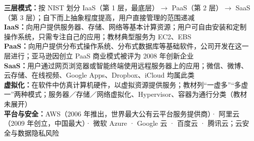 \documentclass[a4paper,11pt]{article}
\begin{document}

\begin{knowmap}
\textbf{三层模式：}按 NIST 划分 IaaS（第 1 层，最底层）$\rightarrow$ PaaS（第 2 层）$\rightarrow$ SaaS（第 3 层）；自下而上抽象程度提高，用户直接管理的范围递减\\[2pt]
\textbf{IaaS：}向用户提供服务器、存储、网络等基本计算资源；用户可自由安装和定制操作系统，只需专注自己的应用；教材典型服务为 EC2、EBS\\[2pt]
\textbf{PaaS：}向用户提供分布式操作系统、分布式数据库等基础软件，公司开发在这一层进行；亚马逊因创立 PaaS 商业模式被评为 2008 年创新企业\\[2pt]
\textbf{SaaS：}用户通过网页浏览器或智能终端使用远程服务器上的应用；微信、微博、云存储、在线视频、Google Apps、Dropbox、iCloud 均属此类\\[2pt]
\textbf{虚拟化：}在软件中仿真计算机硬件，以虚拟资源提供服务；教材列“一虚多”“多虚一”两种模式；服务器／存储／网络虚拟化、Hypervisor、容器为通行分类（教材未展开）\\[2pt]
\textbf{平台与安全：}AWS（2006 年推出，世界最大公有云平台服务提供商）· 阿里云（2009 年创立，中国最大）· 微软 Azure · Google 云 · 百度云 · 腾讯云；云安全与数据隐私风险
\end{knowmap}
\end{document}
